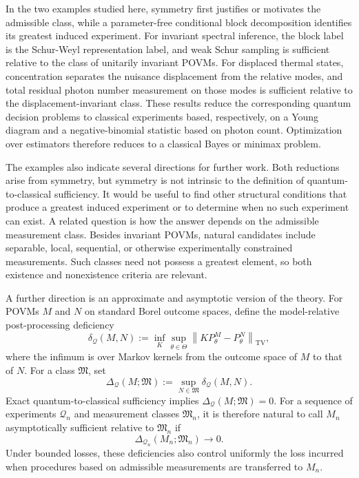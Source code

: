 \documentclass{article}
\theoremstyle{named}
\theoremstyle{named1}
\newcommand{\cQ}{\mathcal Q}
\theoremstyle{plain}
\theoremstyle{remark}
\begin{document}
In the two examples studied here, symmetry first justifies or motivates the
admissible class, while a parameter-free conditional block decomposition
identifies its greatest induced experiment. For invariant spectral
inference, the block label is the Schur-Weyl representation label, and weak
Schur sampling is sufficient relative to the class of unitarily invariant
POVMs. For displaced thermal states, concentration separates the nuisance
displacement from the relative modes, and total residual photon number measurement
on those modes is sufficient relative to the displacement-invariant class.
These results reduce the corresponding quantum decision problems to
classical experiments based, respectively, on a Young diagram and a
negative-binomial statistic based on photon count. Optimization over estimators therefore reduces to a classical Bayes or minimax problem.

The examples also indicate several directions for further work. Both
reductions arise from symmetry, but symmetry is not intrinsic to the
definition of quantum-to-classical sufficiency. It would be useful to find
other structural conditions that produce a greatest induced experiment or
to determine when no such experiment can exist. A related question is how
the answer depends on the admissible measurement class. Besides invariant
POVMs, natural candidates include separable, local, sequential, or
otherwise experimentally constrained measurements. Such classes need not
possess a greatest element, so both existence and nonexistence criteria are
relevant.

A further direction is an approximate and asymptotic version of the
theory. For POVMs $M$ and $N$ on standard Borel outcome spaces, define the
model-relative post-processing deficiency
\[
    \delta_{\cQ}(M,N)
    :=
    \inf_K\sup_{\theta\in\Theta}
    \left\lVert
        K P_\theta^M-P_\theta^N
    \right\rVert_{\mathrm{TV}},
\]
where the infimum is over Markov kernels from the outcome space of $M$ to
that of $N$. For a class $\mathfrak M$, set
\[
    \Delta_{\cQ}(M;\mathfrak M)
    :=
    \sup_{N\in\mathfrak M}\delta_{\cQ}(M,N).
\]
Exact quantum-to-classical sufficiency implies
$\Delta_{\cQ}(M;\mathfrak M)=0$. For a sequence of experiments $\cQ_n$ and
measurement classes $\mathfrak M_n$, it is therefore natural to call
$M_n$ asymptotically sufficient relative to $\mathfrak M_n$ if
\[
    \Delta_{\cQ_n}(M_n;\mathfrak M_n)\rightarrow0.
\]
Under bounded losses, these deficiencies also control uniformly the loss
incurred when procedures based on admissible measurements are transferred
to $M_n$.
\end{document}
